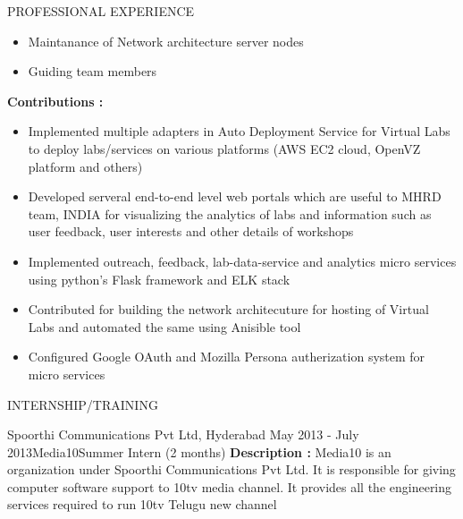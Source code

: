\documentclass{resume} %
\begin{document}
\begin{rSection}{PROFESSIONAL EXPERIENCE}
\begin{rSubsection}
\begin{itemize}
    \item Maintanance of Network architecture server nodes

    \item Guiding team members
    \end{itemize}

    \hfill

    \textbf{Contributions : }
    \begin{itemize}

    \item Implemented multiple adapters in Auto Deployment
      Service for Virtual Labs to deploy labs/services on
      various platforms (AWS EC2 cloud, OpenVZ platform and
      others)
      
    \item Developed serveral end-to-end level web portals
      which are useful to MHRD team, INDIA for visualizing
      the analytics of labs and information such as user
      feedback, user interests and other details of
      workshops
      
    \item Implemented outreach, feedback, lab-data-service
      and analytics micro services using python's Flask
      framework and ELK stack
      
    \item Contributed for building the network architecuture
      for hosting of Virtual Labs and automated the same
      using Anisible tool

    \item Configured Google OAuth and Mozilla Persona
      autherization system for micro services
      
    \end{itemize}
  \end{rSubsection}

\end{rSection}



\begin{rSection}{INTERNSHIP/TRAINING}
  \begin{rSubsection}
  {Spoorthi Communications Pvt Ltd, Hyderabad} {May 2013 -
    July 2013}{Media10}{Summer Intern (2 months)}
  \textbf{Description :} Media10 is an organization under
  Spoorthi Communications Pvt Ltd. It is responsible for
  giving computer software support to 10tv media channel. It
  provides all the engineering services required to run 10tv
  Telugu new channel
  \end{rSubsection} 

\end{rSection} 
\end{document}
